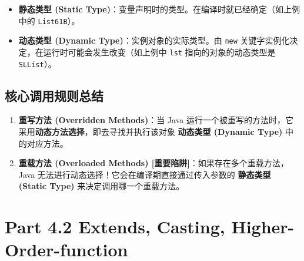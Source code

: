 \documentclass[12pt, a4paper, openany]{ctexbook} %
\begin{document}
\begin{itemize}
    \item \textbf{静态类型 (Static Type)}：变量声明时的类型。在编译时就已经确定（如上例中的 \texttt{List61B}）。
    \item \textbf{动态类型 (Dynamic Type)}：实例对象的实际类型。由 \texttt{new} 关键字实例化决定，在运行时可能会发生改变（如上例中 \texttt{lst} 指向的对象的动态类型是 \texttt{SLList}）。
\end{itemize}

\subsection*{核心调用规则总结}
\begin{enumerate}
    \item \textbf{重写方法 (Overridden Methods)}：当 Java 运行一个被重写的方法时，它采用\textbf{动态方法选择}，即去寻找并执行该对象 \textbf{动态类型 (Dynamic Type)} 中的对应方法。
    \item \textbf{重载方法 (Overloaded Methods) [重要陷阱]}：如果存在多个重载方法，Java 无法进行动态选择！它会在编译期直接通过传入参数的 \textbf{静态类型 (Static Type)} 来决定调用哪一个重载方法。
\end{enumerate}

\section{Part 4.2 Extends, Casting, Higher-Order-function}
\end{document}
